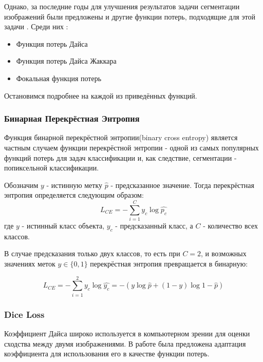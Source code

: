 Однако, за последние годы для улучшения результатов задачи сегментации изображений были предложены и другие функции потерь, подходящие для 
этой задачи \cite{Loss-Functions}. Среди них : 


\begin{itemize}
    \item Функция потерь Дайса\cite{Dice-Loss}
    \item Функция потерь Дайса Жаккара\cite{IoU-Loss}
    \item Фокальная функция потерь \cite{Focal-Loss}
\end{itemize}

Остановимся подробнее на каждой из приведённых функций.

\subsubsection{Бинарная Перекрёстная Энтропия}


Функция бинарной перекрёстной энтропии(binary cross entropy) является частным случаем функции перекрёстной энтропии - одной из самых популярных 
функций потерь для задач классификации и, как следствие, сегментации - попиксельной классификации.

Обозначим $y$ - истинную метку $\hat{p}$ - предсказанное значение.
Тогда перекрёстная энтропия \cite{CE} определяется следующим образом: 
\begin{equation}
    L_{CE} = -\sum_{i=1}^{C}y_c\log{\hat{p_c}}
\end{equation}
где $y$ - истинный класс объекта, $y_c$ - предсказанный класс, а $C$ - количество 
всех классов.

В случае предсказания только двух классов, то есть при $C=2$, 
и возможных значениях меток $y \in \{0,1\}$
перекрёстная энтропия превращается в бинарную:

\begin{equation}
    L_{CE} = -\sum_{i=1}^{2}y_c\log{\hat{y_c}} = 
    -(y\log{\hat{p}} + (1-y)\log{1-\hat{p}})
\end{equation}

\subsubsection{Dice Loss} 

Коэффициент Дайса широко используется в компьютерном зрении для оценки сходства 
между двумя изображениями. В работе \cite{Dice} была предложена адаптация коэффициента 
для использования его в качестве функции потерь. 

